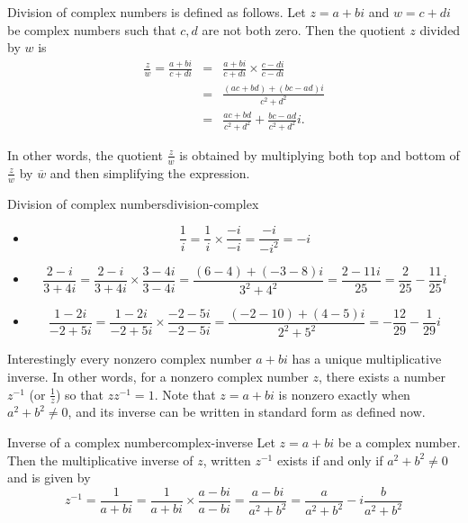 Division of complex numbers is defined as follows. Let $z=a+bi$ and $w=c+di$ be complex numbers such that $c,d$ are not both zero. Then the quotient $z$ divided by $w$ is
\begin{eqnarray*}
\frac{z}{w}=
\frac{a+bi}{c+di} & = & \frac{a+bi}{c+di}\times \frac{c-di}{c-di} \\
& = & \frac{(ac+bd)+(bc-ad)i}{c^2+d^2} \\
& = & \frac{ac+bd}{c^2+d^2} +\frac{bc-ad}{c^2+d^2}i.
\end{eqnarray*}

In other words, the quotient $\frac{z}{w}$ is obtained by multiplying
both top and bottom of $\frac{z}{w}$ by $\overline{w}$ and
then simplifying the expression.

\begin{example}{Division of complex numbers}{division-complex}
\begin{itemize}
\item
\[ \frac{1}{i} = \frac{1}{i}\times \frac{-i}{-i}
=\frac{-i}{-i^2}=-i \]

\item
\[ \frac{2-i}{3+4i} = \frac{2-i}{3+4i}\times \frac{3-4i}{3-4i}
=\frac{(6-4)+(-3-8)i}{3^2+4^2}
=\frac{2-11i}{25}
=\frac{2}{25} - \frac{11}{25}i \]

\item

\[ \frac{1-2i}{-2+5i} = \frac{1-2i}{-2+5i}\times \frac{-2-5i}{-2-5i}
=\frac{(-2-10) + (4-5)i}{2^2+5^2}
=-\frac{12}{29}-\frac{1}{29}i  \]
\end{itemize}
\end{example}

Interestingly every nonzero complex number $a+bi$ has a unique
multiplicative inverse. In other words, for a nonzero complex number
$z$, there exists a number $z^{-1}$ (or $\frac{1}{z}$) so that
$zz^{-1} = 1$. Note that $z=a+bi$ is nonzero exactly when
$a^{2}+b^{2}\neq 0$, and its inverse can be written in standard form as defined now. 

\begin{definition}{Inverse of a complex number}{complex-inverse}
Let $z = a+bi$ be a complex number. Then the multiplicative inverse of $z$, written $z^{-1}$ exists if and only if $a^{2}+b^{2}\neq 0$ and is given by 
\begin{equation*}
z^{-1} = \frac{1}{a+bi}  = \frac{1}{a+bi}\times \frac{a-bi}{a-bi}=\frac{a-bi}{a^{2}+b^{2}}=\frac{a}{a^{2}+b^{2}}-i\frac{b}{
a^{2}+b^{2}}
\end{equation*}
\end{definition}

